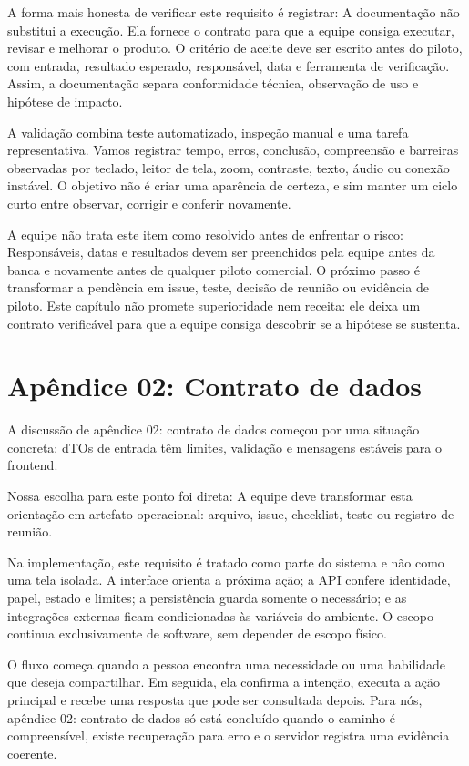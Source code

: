 \documentclass[12pt,oneside,a4paper,article]{abntex2}
\begin{document}
A forma mais honesta de verificar este requisito é registrar: A documentação não substitui a execução. Ela fornece o contrato para que a equipe consiga executar, revisar e melhorar o produto. O critério de aceite deve ser escrito antes do piloto, com entrada, resultado esperado, responsável, data e ferramenta de verificação. Assim, a documentação separa conformidade técnica, observação de uso e hipótese de impacto.

A validação combina teste automatizado, inspeção manual e uma tarefa representativa. Vamos registrar tempo, erros, conclusão, compreensão e barreiras observadas por teclado, leitor de tela, zoom, contraste, texto, áudio ou conexão instável. O objetivo não é criar uma aparência de certeza, e sim manter um ciclo curto entre observar, corrigir e conferir novamente.

A equipe não trata este item como resolvido antes de enfrentar o risco: Responsáveis, datas e resultados devem ser preenchidos pela equipe antes da banca e novamente antes de qualquer piloto comercial. O próximo passo é transformar a pendência em issue, teste, decisão de reunião ou evidência de piloto. Este capítulo não promete superioridade nem receita: ele deixa um contrato verificável para que a equipe consiga descobrir se a hipótese se sustenta.

\section{Apêndice 02: Contrato de dados}
A discussão de apêndice 02: contrato de dados começou por uma situação concreta: dTOs de entrada têm limites, validação e mensagens estáveis para o frontend.

Nossa escolha para este ponto foi direta: A equipe deve transformar esta orientação em artefato operacional: arquivo, issue, checklist, teste ou registro de reunião.

Na implementação, este requisito é tratado como parte do sistema e não como uma tela isolada. A interface orienta a próxima ação; a API confere identidade, papel, estado e limites; a persistência guarda somente o necessário; e as integrações externas ficam condicionadas às variáveis do ambiente. O escopo continua exclusivamente de software, sem depender de escopo físico.

O fluxo começa quando a pessoa encontra uma necessidade ou uma habilidade que deseja compartilhar. Em seguida, ela confirma a intenção, executa a ação principal e recebe uma resposta que pode ser consultada depois. Para nós, apêndice 02: contrato de dados só está concluído quando o caminho é compreensível, existe recuperação para erro e o servidor registra uma evidência coerente.
\end{document}
